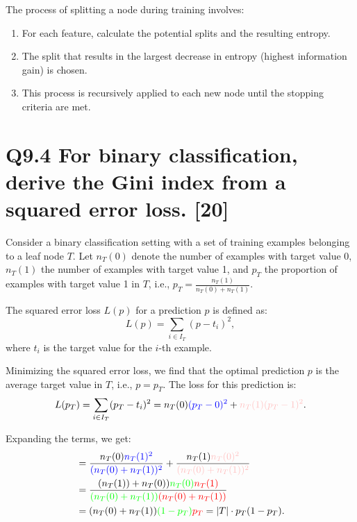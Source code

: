 \documentclass[11pt]{article}
\begin{document}
The process of splitting a node during training involves:

\begin{enumerate}
    \item For each feature, calculate the potential splits and the resulting entropy.
    \item The split that results in the largest decrease in entropy (highest information gain) is chosen.
    \item This process is recursively applied to each new node until the stopping criteria are met.
\end{enumerate}

\section{Q9.4 For binary classification, derive the Gini index from a squared error loss. [20]}


Consider a binary classification setting with a set of training examples belonging to a leaf node \( T \). Let \( n_T(0) \) denote the number of examples with target value 0, \( n_T(1) \) the number of examples with target value 1, and \( p_T \) the proportion of examples with target value 1 in \( T \), i.e., \( p_T = \frac{n_T(1)}{n_T(0) + n_T(1)} \).

The squared error loss \( L(p) \) for a prediction \( p \) is defined as:
\[
L(p) = \sum_{i \in I_T} (p - t_i)^2,
\]
where \( t_i \) is the target value for the \( i \)-th example.

Minimizing the squared error loss, we find that the optimal prediction \( p \) is the average target value in \( T \), i.e., \( p = p_T \). The loss for this prediction is:
\[
L(p_T) = \sum_{i \in I_T} (p_T - t_i)^2 = n_T(0)\textcolor{blue}{(p_T - 0)^2} + \textcolor{pink}{n_T(1)(p_T - 1)^2}.
\]

Expanding the terms, we get:
\begin{equation}
\begin{aligned}
&= \frac{n_T(0)\textcolor{blue}{n_T(1)^2}}{\textcolor{blue}{(n_T(0) + n_T(1))^2}} + \frac{n_T(1)\textcolor{pink}{n_T(0)^2}}{\textcolor{pink}{(n_T(0) + n_T(1))^2}} \\
&= \frac{{(n_T(1))} + {n_T(0))}\textcolor{green}{n_T(0)}\textcolor{red}{n_T(1)}}{\textcolor{green}{(n_T(0) + n_T(1))}\textcolor{red}{(n_T(0) + n_T(1))}}\\
&= ({n_T(0) + n_T(1)})\textcolor{green}{(1 - {p_T})}\textcolor{red}{p_T} = |T| \cdot p_T(1 - {p_T}).
\end{aligned}
\end{equation}
    
\end{document}
